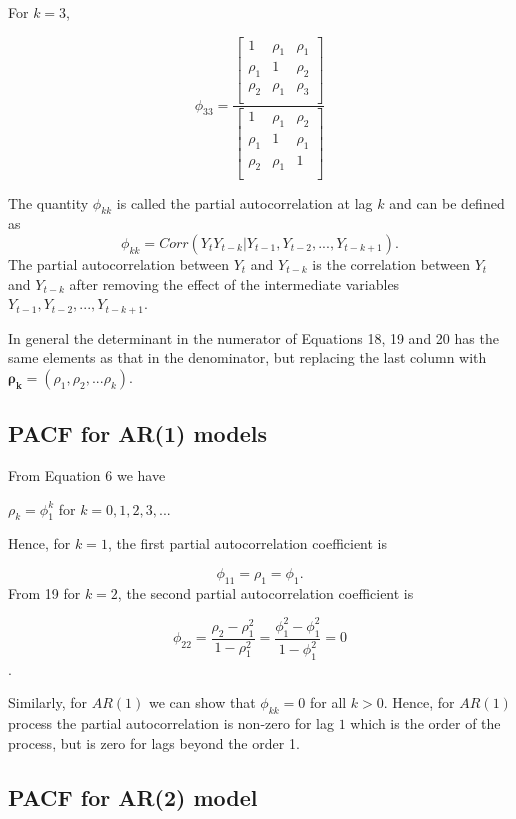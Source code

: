 \documentclass[
  11pt,
  a4paper,
]{report}
\begin{document}
For \(k=3\),

\begin{equation}
\phi_{33}=\frac{\left[\begin{array}
{rrr}
1 & \rho_1 & \rho_1  \\
\rho_1 & 1 & \rho_2  \\
\rho_2 & \rho_1 & \rho_3  \\
\end{array}\right]}{\left[\begin{array}
{rrr}
1 & \rho_1 & \rho_2  \\
\rho_1 & 1 & \rho_1  \\
\rho_2 & \rho_1 & 1  \\
\end{array}\right]}
\end{equation}

The quantity \(\phi_{kk}\) is called the partial autocorrelation at lag
\(k\) and can be defined as
\[\phi_{kk}=Corr(Y_tY_{t-k}|Y_{t-1}, Y_{t-2},..., Y_{t-k+1}).\] The
partial autocorrelation between \(Y_t\) and \(Y_{t-k}\) is the
correlation between \(Y_t\) and \(Y_{t-k}\) after removing the effect of
the intermediate variables \(Y_{t-1}, Y_{t-2}, ..., Y_{t-k+1}\).

In general the determinant in the numerator of Equations 18, 19 and 20
has the same elements as that in the denominator, but replacing the last
column with \(\bm{\rho_k}= (\rho_1, \rho_2,...\rho_k).\)

\subsection{PACF for AR(1) models}\label{pacf-for-ar1-models}

From Equation 6 we have

\(\rho_k=\phi_1^k\) for \(k=0, 1, 2, 3,...\)

Hence, for \(k=1\), the first partial autocorrelation coefficient is

\[\phi_{11}=\rho_1=\phi_1.\] From 19 for \(k=2\), the second partial
autocorrelation coefficient is

\[\phi_{22}=\frac{\rho_2-\rho_1^2}{1-\rho_1^2}=\frac{\phi_1^2-\phi_1^2}{1-\phi_1^2} = 0\].

Similarly, for \(AR(1)\) we can show that \(\phi_{kk}=0\) for all
\(k > 0\). Hence, for \(AR(1)\) process the partial autocorrelation is
non-zero for lag \(1\) which is the order of the process, but is zero
for lags beyond the order 1.

\subsection{PACF for AR(2) model}\label{pacf-for-ar2-model}
\end{document}
